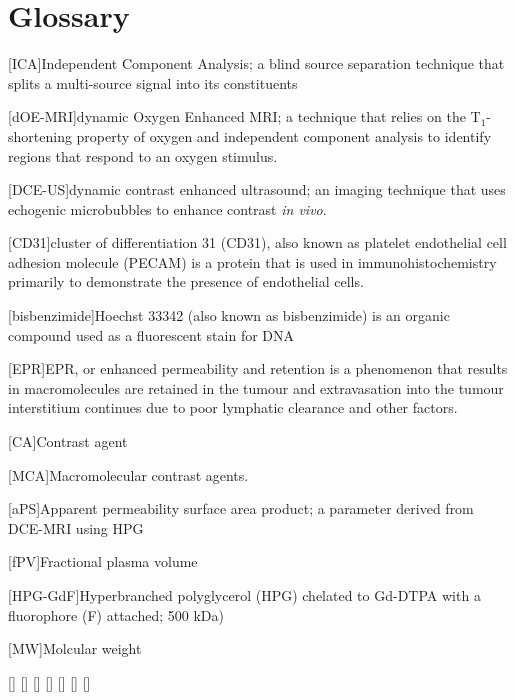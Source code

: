 
\chapter{Glossary}




\begin{acronym}

[ICA]{Independent Component Analysis; a blind source separation technique that splits a multi-source signal into its constituents}

[dOE-MRI]{dynamic Oxygen Enhanced MRI; a technique that relies on the T$_1$-shortening property of oxygen and independent component analysis to identify regions that respond to an oxygen stimulus.}

[DCE-US]{dynamic contrast enhanced ultrasound; an imaging technique that uses echogenic microbubbles to enhance contrast \emph{in vivo}.}

[CD31]{cluster of differentiation 31 (CD31), also known as platelet endothelial cell adhesion molecule (PECAM) is a protein that is used in immunohistochemistry primarily to demonstrate the presence of endothelial cells.}

[bisbenzimide]{Hoechst 33342 (also known as bisbenzimide) is an organic compound used as a fluorescent stain for DNA}

[EPR]{EPR, or enhanced permeability and retention is a phenomenon that results in macromolecules are retained in the tumour and extravasation into the tumour interstitium continues due to poor lymphatic clearance and other factors.}

[CA]{Contrast agent}

[MCA]{Macromolecular contrast agents.}

[aPS]{Apparent permeability surface area product; a parameter derived from DCE-MRI using HPG}

[fPV]{Fractional plasma volume}

[HPG-GdF]{Hyperbranched polyglycerol (HPG) chelated to Gd-DTPA with a fluorophore (F) attached; 500 kDa) }

[MW]{Molcular weight}

\acro{}[]{}
\acro{}[]{}
\acro{}[]{}
\acro{}[]{}
\acro{}[]{}
\acro{}[]{}
\acro{}[]{}



\end{acronym}

